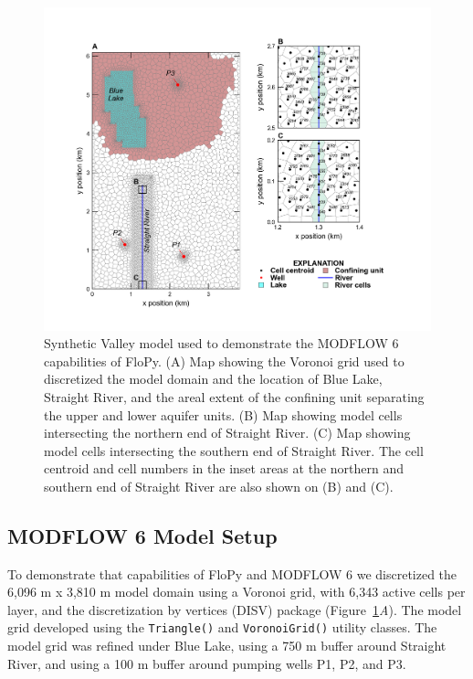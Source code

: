 \documentclass[11pt, oneside]{article}  	%
\begin{document}
\begin{figure}[ht!]
	\begin{center}
		\includegraphics{figures/mv_voronoi_river_discretization.png}
	\end{center}
	\caption{Synthetic Valley model used to demonstrate the MODFLOW 6 capabilities of FloPy. (A) Map showing the Voronoi grid used to discretized the model domain and the location of Blue Lake, Straight River, and the areal extent of the confining unit separating the upper and lower aquifer units. (B) Map showing model cells intersecting the northern end of Straight River. (C) Map showing model cells intersecting the southern end of Straight River. The cell centroid and cell numbers in the inset areas at the northern and southern end of Straight River are also shown on (B) and (C).}
	\label{fig:mvgrid}
\end{figure}

\subsection{MODFLOW 6 Model Setup}

To demonstrate that capabilities of FloPy and MODFLOW 6 we discretized the 6,096 m x 3,810 m model domain using a Voronoi grid, with 6,343 active cells per layer, and the discretization by vertices (DISV) package (Figure~\ref{fig:mvgrid}\textit{A}). The model grid developed using the \texttt{Triangle()} and \texttt{VoronoiGrid()} utility classes. The model grid was refined under Blue Lake, using a 750 m buffer around Straight River,  and using a 100 m buffer around pumping wells P1, P2, and P3.
\end{document}
